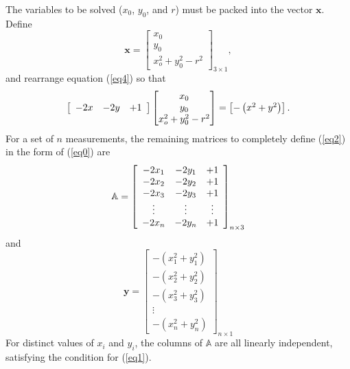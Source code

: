 \documentclass[11pt,letterpaper,onecolumn]{IEEEtran}
\begin{document}
The variables to be solved ($x_0$, $y_0$, and $r$) must be packed into the vector $\mathbf{x}$.
Define
\begin{equation}
\mathbf{x} = 
\begin{bmatrix}
x_0 \\ y_0 \\ x_o^2 + y_0^2 -r^2
\end{bmatrix}_{ 3 \times 1},
\end{equation}
and rearrange equation (\ref{eq4}) so that  
\begin{equation}
\begin{bmatrix}
\begin{array}{c c c}
-2x &-2y  &+1
\end{array}
\end{bmatrix}
\begin{bmatrix}
x_0 \\ y_0 \\ x_o^2 + y_0^2 -r^2
\end{bmatrix} = 
\begin{bmatrix}
-\left(x^2 + y^2\right)
\end{bmatrix}.
\end{equation}
For a set of $n$ measurements, the remaining matrices to completely define (\ref{eq2}) in the form of (\ref{eq0}) are
\begin{equation}
\mathbb{A} = 
\begin{bmatrix}
\begin{array}{c c c}
-2x_1 &-2y_1 &+1 \\
-2x_2 &-2y_2 &+1 \\
-2x_3 &-2y_3 &+1 \\
\vdots	& \vdots & \vdots \\
-2x_n &-2y_n &+1 \\
\end{array}
\end{bmatrix}_{ n \times 3}
\end{equation}
and 
\begin{equation}
\mathbf{y} = 
\begin{bmatrix}
-\left(x_1^2+y_1^2\right)\\
-\left(x_2^2+y_2^2\right)\\
-\left(x_3^2+y_3^2\right)\\
\vdots\\
-\left(x_n^2+y_n^2\right)
\end{bmatrix}_{ n \times 1}
\end{equation}
For distinct values of $x_i$ and $y_i$, the columns of $\mathbb{A}$ are all linearly independent, satisfying the condition for (\ref{eq1}).
\end{document}
